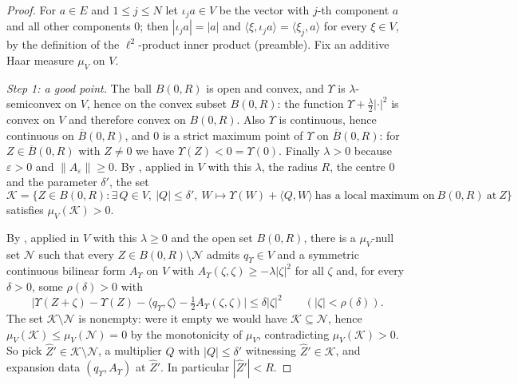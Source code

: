 \begin{proof}
For $a\in E$ and $1\le j\le N$ let $\iota_ja\in V$ be the vector with $j$-th
component $a$ and all other components $0$; then $|\iota_ja|=|a|$ and
$\langle\xi,\iota_ja\rangle=\langle\xi_j,a\rangle$ for every $\xi\in V$, by the
definition of the $\ell^2$-product inner product (preamble). Fix an additive
Haar measure $\mu_V$ on $V$.

\emph{Step 1: a good point.}
The ball $B(0,R)$ is open and convex, and $\Upsilon$ is $\lambda$-semiconvex on
$V$, hence on the convex subset $B(0,R)$: the function
$\Upsilon+\tfrac\lambda2|\cdot|^2$ is convex on $V$ and therefore convex on
$B(0,R)$. Also $\Upsilon$ is continuous, hence continuous on
$\overline B(0,R)$, and $0$ is a strict maximum point of $\Upsilon$ on
$\overline B(0,R)$: for $Z\in\overline B(0,R)$ with $Z\ne0$ we have
$\Upsilon(Z)<0=\Upsilon(0)$. Finally $\lambda>0$ because $\varepsilon>0$ and
$\|A_\varepsilon\|\ge0$. By , applied in $V$ with this
$\lambda$, the radius $R$, the centre $0$ and the parameter $\delta'$, the set
\[
  \mathcal K=\bigl\{Z\in B(0,R):\exists\,Q\in V,\ |Q|\le\delta',\
    W\mapsto\Upsilon(W)+\langle Q,W\rangle\ \text{has a local maximum on}\
    B(0,R)\ \text{at}\ Z\bigr\}
\]
satisfies $\mu_V(\mathcal K)>0$.

By , applied in $V$ with this $\lambda\ge0$ and
the open set $B(0,R)$, there is a $\mu_V$-null set $\mathcal N$ such that every
$Z\in B(0,R)\setminus\mathcal N$ admits $q_\Upsilon\in V$ and a symmetric
continuous bilinear form $A_\Upsilon$ on $V$ with
$A_\Upsilon(\zeta,\zeta)\ge-\lambda|\zeta|^2$ for all $\zeta$ and, for every
$\delta>0$, some $\rho(\delta)>0$ with
\begin{equation}\label{eq:srjj-expansion}
  \bigl|\Upsilon(Z+\zeta)-\Upsilon(Z)-\langle q_\Upsilon,\zeta\rangle
    -\tfrac12A_\Upsilon(\zeta,\zeta)\bigr|\le\delta|\zeta|^2
  \qquad(|\zeta|<\rho(\delta)).
\end{equation}
The set $\mathcal K\setminus\mathcal N$ is nonempty: were it empty we would
have $\mathcal K\subseteq\mathcal N$, hence
$\mu_V(\mathcal K)\le\mu_V(\mathcal N)=0$ by the monotonicity of $\mu_V$,
contradicting $\mu_V(\mathcal K)>0$. So pick
$\widehat Z'\in\mathcal K\setminus\mathcal N$, a multiplier $Q$ with
$|Q|\le\delta'$ witnessing $\widehat Z'\in\mathcal K$, and expansion data
$(q_\Upsilon,A_\Upsilon)$ at $\widehat Z'$. In particular
$|\widehat Z'|<R$.


\end{proof}
